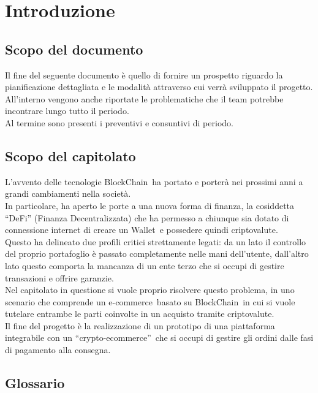 \section{Introduzione} \label{introduzione}

\subsection{Scopo del documento} \label{intro_scopo_documento}
Il fine del seguente documento è quello di fornire un prospetto riguardo la pianificazione dettagliata e le modalità attraverso cui verrà sviluppato il progetto.\\
All'interno vengono anche riportate le problematiche che il team potrebbe incontrare lungo tutto il periodo.\\
Al termine sono presenti i preventivi e consuntivi di periodo.

\subsection{Scopo del capitolato} \label{intro_scopo_capitolato}
L'avvento delle tecnologie BlockChain\glo\ ha portato e porterà nei prossimi anni a grandi cambiamenti nella società.\\
In particolare, ha aperto le porte a una nuova forma di finanza, la cosiddetta “DeFi” (Finanza Decentralizzata) che ha permesso a chiunque sia dotato di connessione
 internet di creare un Wallet\glo\ e possedere quindi criptovalute\glo.\\
Questo ha delineato due profili critici strettamente legati: da un lato il controllo del proprio portafoglio è passato completamente nelle mani dell'utente, 
dall'altro lato questo comporta la mancanza di un ente terzo che si occupi di gestire transazioni e offrire garanzie.\\
Nel capitolato in questione si vuole proprio risolvere questo problema, in uno scenario che comprende un e-commerce\glo\ basato su BlockChain\glo\ in cui si 
vuole tutelare entrambe le parti coinvolte in un acquisto tramite criptovalute.\\
Il fine del progetto è la realizzazione di un prototipo di una piattaforma integrabile con un “crypto-ecommerce”\glo\, che si occupi di gestire gli ordini dalle 
fasi di pagamento alla consegna.

\subsection{Glossario} \label{intro_glossario}
\gloDesc

